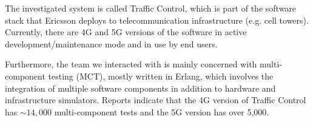 The investigated system is called Traffic Control, which is part of the software stack that Ericsson deploys to telecommunication infrastructure (e.g. cell towers).
Currently, there are 4G and 5G versions of the software in active development/maintenance mode and in use by end users.

Furthermore, the team we interacted with is mainly concerned with multi-component testing (MCT), mostly written in Erlang, which involves the integration of multiple software components in addition to hardware and infrastructure simulators.
Reports indicate that the 4G version of Traffic Control has $\sim14,000$ multi-component tests and the 5G version has over 5,000.



%
%
%
